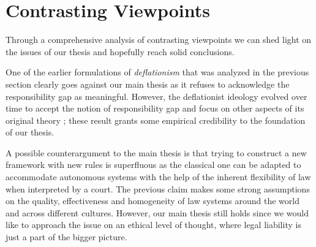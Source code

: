 \section{Contrasting Viewpoints}\label{sec:viewpoints}

Through a comprehensive analysis of contrasting viewpoints we can shed light on the issues of our thesis and hopefully reach solid conclusions.

One of the earlier formulations of \textit{deflationism} \parencite{HAYTMP} that was analyzed in the previous section clearly goes against our main thesis as it refuses to acknowledge the responsibility gap as meaningful.
However, the deflationist ideology evolved over time to accept the notion of responsibility gap and focus on other aspects of its original theory \parencite{SIJWA}; these result grants some empirical credibility to the foundation of our thesis.

A possible counterargument to the main thesis is that trying to construct a new framework with new rules is superfluous as the classical one can be adapted to accommodate autonomous systems with the help of the inherent flexibility of law when interpreted by a court.
The previous claim makes some strong assumptions on the quality, effectiveness and homogeneity of law systems around the world and across different cultures.
However, our main thesis still holds since we would like to approach the issue on an ethical level of thought, where legal liability is just a part of the bigger picture.

